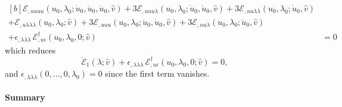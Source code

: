 \documentclass[12pt, final]{scrartcl}
\theoremstyle{definition}
\newcommand{\E}{\mathcal E}
\newcommand{\EE}{\mathcal E ^ \dagger}
\begin{document}
\begin{equation}
  \begin{aligned}[b]
    \E_{,uuuu}(u_0, \lambda_0; \dot{u}_0, \dot{u}_0, \dot{u}_0, \hat{v})
    + 3\E_{,uuu\lambda}(u_0, \lambda_0; \dot{u}_0, \dot{u}_0, \hat{v})
    + 3\E_{,uu\lambda\lambda}(u_0, \lambda_0; \dot{u}_0, \hat{v}) &\\
    + \E_{,u\lambda\lambda\lambda}(u_0, \lambda_0; \hat{v})
    + 3\E_{,uuu}(u_0, \lambda_0; \ddot{u}_0, \dot{u}_0, \hat{v})
    + 3\E_{,uu\lambda}(u_0, \lambda_0; \ddot{u}_0, \hat{v}) &\\
    + \epsilon_{,\lambda\lambda\lambda} \, \EE_{,u\epsilon}(u_0, \lambda_0, 0; \hat{v}) &= 0
  \end{aligned}
\end{equation}
which reduces
\begin{equation}
  \dddot{\E}_1(\lambda; \hat{v}) + \epsilon_{,\lambda\lambda\lambda} \, \EE_{,u\epsilon}(u_0, \lambda_0, 0; \hat{v}) = 0,
\end{equation}
and \(\epsilon_{,\lambda\lambda\lambda}(0, \ldots, 0, \lambda_0) = 0\) since the first term vanishes.

\paragraph{Summary}
\end{document}
